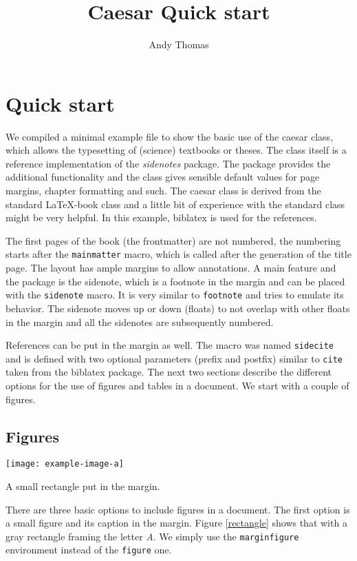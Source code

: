 \documentclass{caesar_book}
\title{Caesar Quick start}
\author{Andy Thomas}
\begin{document}
\frontmatter
\maketitlepage
\tableofcontents
\mainmatter
\chapter{Quick start}
%
We compiled a minimal example file to show the basic use of the caesar class, which allows the typesetting of (science) textbooks or theses. The class itself is a reference implementation of the \emph{sidenotes} package. The package provides the additional functionality and the class gives sensible default values for page margins, chapter formatting and such. The caesar class is derived from the standard \LaTeX-book class and a little bit of experience with the standard class might be very helpful. In this example, biblatex is used for the references.

The first pages of the book (the frontmatter) are not numbered, the numbering starts after the \texttt{mainmatter} macro, which is called after the generation of the title page. The layout has ample margins to allow annotations. A main feature and the package is the sidenote, which is a footnote in the margin and can be placed with the \texttt{sidenote} macro. It is very similar to \texttt{footnote} and tries to emulate its behavior. The sidenote moves up or down (floats) to not overlap with other floats in the margin and all the sidenotes are subsequently numbered. 

References can be put in the margin as well. The macro was named \texttt{sidecite} and is defined with two optional parameters (prefix and postfix) similar to \texttt{cite} taken from the biblatex package. The next two sections describe the different options for the use of figures and tables in a document. We start with a couple of figures.
\section{Figures}
%
\begin{marginfigure}%
    \texttt{[image: example-image-a]}%
    \caption{A small rectangle put in the margin.\label{rectangle}}%
\end{marginfigure}%
%
There are three basic options to include figures in a document. The first option is a small figure and its caption in the margin. Figure \ref{rectangle} shows that with a gray rectangle framing the letter \emph{A}. We simply use the \texttt{marginfigure} environment instead of the \texttt{figure} one. 
\end{document}

